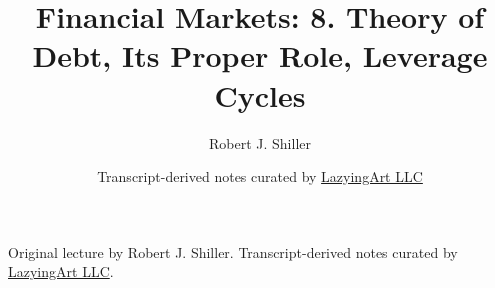 \documentclass[11pt,oneside]{book}
\begin{document}
\frontmatter
\title{Financial Markets: 8. Theory of Debt, Its Proper Role, Leverage Cycles}
\author{Robert J. Shiller}
\date{Transcript-derived notes curated by \href{https://lazying.art}{LazyingArt LLC}}
\maketitle
\begin{center}
\small Original lecture by Robert J. Shiller. Transcript-derived notes curated by \href{https://lazying.art}{LazyingArt LLC}.
\end{center}
\clearpage
\mainmatter

\end{document}
